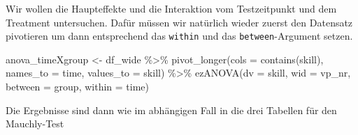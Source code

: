 \documentclass[
]{book}
\newenvironment{Shaded}{\begin{snugshade}}{\end{snugshade}}
\newcommand{\AttributeTok}[1]{\textcolor[rgb]{0.77,0.63,0.00}{#1}}
\newcommand{\FunctionTok}[1]{\textcolor[rgb]{0.00,0.00,0.00}{#1}}
\newcommand{\NormalTok}[1]{#1}
\newcommand{\OtherTok}[1]{\textcolor[rgb]{0.56,0.35,0.01}{#1}}
\newcommand{\SpecialCharTok}[1]{\textcolor[rgb]{0.00,0.00,0.00}{#1}}
\newcommand{\StringTok}[1]{\textcolor[rgb]{0.31,0.60,0.02}{#1}}
\begin{document}
Wir wollen die Haupteffekte und die Interaktion vom Testzeitpunkt und dem Treatment untersuchen. Dafür müssen wir natürlich wieder zuerst den Datensatz pivotieren um dann entsprechend das \texttt{within} und das \texttt{between}-Argument setzen.

\begin{Shaded}
\begin{Highlighting}[]
\NormalTok{anova\_timeXgroup }\OtherTok{\textless{}{-}}\NormalTok{ df\_wide }\SpecialCharTok{\%\textgreater{}\%} 
  \FunctionTok{pivot\_longer}\NormalTok{(}\AttributeTok{cols =} \FunctionTok{contains}\NormalTok{(}\StringTok{\textquotesingle{}skill\textquotesingle{}}\NormalTok{),}
               \AttributeTok{names\_to =} \StringTok{\textquotesingle{}time\textquotesingle{}}\NormalTok{,}
               \AttributeTok{values\_to =} \StringTok{\textquotesingle{}skill\textquotesingle{}}\NormalTok{) }\SpecialCharTok{\%\textgreater{}\%} 
  \FunctionTok{ezANOVA}\NormalTok{(}\AttributeTok{dv =}\NormalTok{ skill,}
          \AttributeTok{wid =}\NormalTok{ vp\_nr,}
          \AttributeTok{between =}\NormalTok{ group,}
          \AttributeTok{within =}\NormalTok{ time)}
\end{Highlighting}
\end{Shaded}

Die Ergebnisse sind dann wie im abhängigen Fall in die drei Tabellen für den Mauchly-Test

\begin{Shaded}
\end{Shaded}

 
  \providecommand{\huxb}[2]{\arrayrulecolor[RGB]{#1}\global\arrayrulewidth=#2pt}
  \providecommand{\huxvb}[2]{\color[RGB]{#1}\vrule width #2pt}
  \providecommand{\huxtpad}[1]{\rule{0pt}{#1}}
  \providecommand{\huxbpad}[1]{\rule[-#1]{0pt}{#1}}
\end{document}
